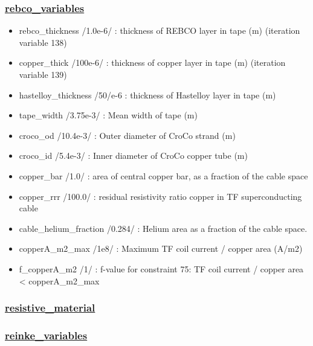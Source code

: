 \documentclass[]{article}
\providecommand{\tightlist}{%
  \setlength{\itemsep}{0pt}\setlength{\parskip}{0pt}}
\begin{document}
\begin{itemize}
  \subsubsection{\texorpdfstring{\href{rebco_variables.html}{rebco\_variables}}{rebco\_variables}}\label{rebco_variables}

  \begin{itemize}
  \tightlist
  \item
    rebco\_thickness /1.0e-6/ : thickness of REBCO layer in tape (m)
    (iteration variable 138)
  \item
    copper\_thick /100e-6/ : thickness of copper layer in tape (m)
    (iteration variable 139)
  \item
    hastelloy\_thickness /50/e-6 : thickness of Hastelloy layer in tape
    (m)
  \item
    tape\_width /3.75e-3/ : Mean width of tape (m)
  \item
    croco\_od /10.4e-3/ : Outer diameter of CroCo strand (m)
  \item
    croco\_id /5.4e-3/ : Inner diameter of CroCo copper tube (m)
  \item
    copper\_bar /1.0/ : area of central copper bar, as a fraction of the
    cable space
  \item
    copper\_rrr /100.0/ : residual resistivity ratio copper in TF
    superconducting cable
  \item
    cable\_helium\_fraction /0.284/ : Helium area as a fraction of the
    cable space.
  \item
    copperA\_m2\_max /1e8/ : Maximum TF coil current / copper area
    (A/m2)
  \item
    f\_copperA\_m2 /1/ : f-value for constraint 75: TF coil current /
    copper area \textless{} copperA\_m2\_max
  \end{itemize}

  \subsubsection{\texorpdfstring{\href{resistive_material.html}{resistive\_material}}{resistive\_material}}\label{resistive_material}

  \subsubsection{\texorpdfstring{\href{reinke_variables.html}{reinke\_variables}}{reinke\_variables}}\label{reinke_variables}


\end{itemize}
\end{document}
